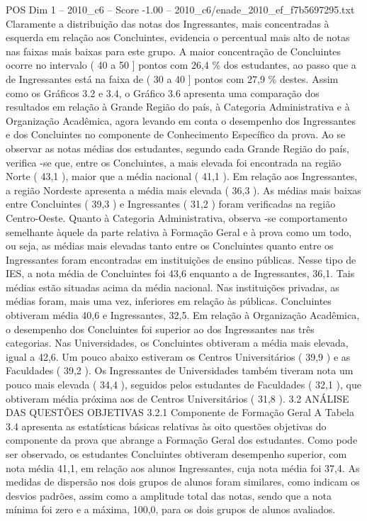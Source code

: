 \begin{textsample}{POS Dim 1 – 2010\_c6 – Score -1.00 – 2010\_c6/enade\_2010\_ef\_f7b5697295.txt}
Claramente a distribuição das notas dos Ingressantes, mais concentradas à esquerda em relação aos Concluintes, evidencia o percentual mais alto de notas nas faixas mais baixas para este grupo.
A maior concentração de Concluintes ocorre no intervalo ( 40 a 50 ] pontos com 26,4 \% dos estudantes, ao passo que a de Ingressantes está na faixa de ( 30 a 40 ] pontos com 27,9 \% destes.
Assim como os Gráficos 3.2 e 3.4, o Gráfico 3.6 apresenta uma comparação dos resultados em relação à Grande Região do país, à Categoria Administrativa e à Organização Acadêmica, agora levando em conta o desempenho dos Ingressantes e dos Concluintes no componente de Conhecimento Específico da prova.
Ao se observar as notas médias dos estudantes, segundo cada Grande Região do país, verifica -se que, entre os Concluintes, a mais elevada foi encontrada na região Norte ( 43,1 ), maior que a média nacional ( 41,1 ).
Em relação aos Ingressantes, a região Nordeste apresenta a média mais elevada ( 36,3 ).
As médias mais baixas entre Concluintes ( 39,3 ) e Ingressantes ( 31,2 ) foram verificadas na região Centro-Oeste.
Quanto à Categoria Administrativa, observa -se comportamento semelhante àquele da parte relativa à Formação Geral e à prova como um todo, ou seja, as médias mais elevadas tanto entre os Concluintes quanto entre os Ingressantes foram encontradas em instituições de ensino públicas.
Nesse tipo de IES, a nota média de Concluintes foi 43,6 enquanto a de Ingressantes, 36,1.
Tais médias estão situadas acima da média nacional.
Nas instituições privadas, as médias foram, mais uma vez, inferiores em relação às públicas.
Concluintes obtiveram média 40,6 e Ingressantes, 32,5.
Em relação à Organização Acadêmica, o desempenho dos Concluintes foi superior ao dos Ingressantes nas três categorias.
Nas Universidades, os Concluintes obtiveram a média mais elevada, igual a 42,6.
Um pouco abaixo estiveram os Centros Universitários ( 39,9 ) e as Faculdades ( 39,2 ).
Os Ingressantes de Universidades também tiveram nota um pouco mais elevada ( 34,4 ), seguidos pelos estudantes de Faculdades ( 32,1 ), que obtiveram média próxima aos de Centros Universitários ( 31,8 ). 3.2 ANÁLISE DAS QUESTÕES OBJETIVAS 3.2.1 Componente de Formação Geral A Tabela 3.4 apresenta as estatísticas básicas relativas às oito questões objetivas do componente da prova que abrange a Formação Geral dos estudantes.
Como pode ser observado, os estudantes Concluintes obtiveram desempenho superior, com nota média 41,1, em relação aos alunos Ingressantes, cuja nota média foi 37,4.
As medidas de dispersão nos dois grupos de alunos foram similares, como indicam os desvios padrões, assim como a amplitude total das notas, sendo que a nota mínima foi zero e a máxima, 100,0, para os dois grupos de alunos avaliados.

\end{textsample}
